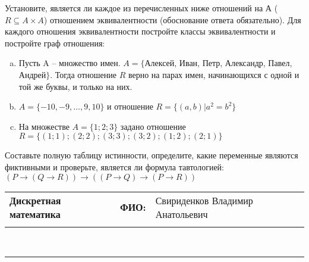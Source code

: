 \documentclass[10pt]{exam}
\newcommand{\class}{Дискретная математика}
\newcommand{\examdate}{}
\begin{document}
\begin{questions}
\question
Установите, является ли каждое из перечисленных ниже отношений на А ($R \subseteq A \times A$) отношением эквивалентности (обоснование ответа обязательно). Для каждого отношения эквивалентности постройте классы 
эквивалентности и постройте граф отношения:
\begin{enumerate} [a)]\setcounter{enumi}{0}
\item Пусть A – множество имен. $A = \{ $Алексей, Иван, Петр, Александр, Павел, Андрей$ \}$. Тогда отношение $R$ верно на парах имен, начинающихся с одной и той же буквы, и только на них.
\item $A = \{-10, -9, … , 9, 10\}$ и отношение $ R = \{(a,b)|a^{2} = b^{2}\}$
\item На множестве $A = \{1; 2; 3\}$ задано отношение $R = \{(1; 1); (2; 2); (3; 3); (3; 2); (1; 2); (2; 1)\}$
\end{enumerate}\question Составьте полную таблицу истинности, определите, какие переменные являются фиктивными и проверьте, является ли формула тавтологией:
$(P \rightarrow (Q \rightarrow R)) \rightarrow ((P \rightarrow Q) \rightarrow (P \rightarrow R))$

\end{questions}
\newpage
\begin{flushright}
\begin{tabular}{p{2.8in} r l}
\textbf{\class} & \textbf{ФИО:} &Свириденков Владимир Анатольевич
\\

\textbf{\examdate} &&\\
\end{tabular}\\
\end{flushright}
\rule[1ex]{\textwidth}{.1pt}
\end{document}
